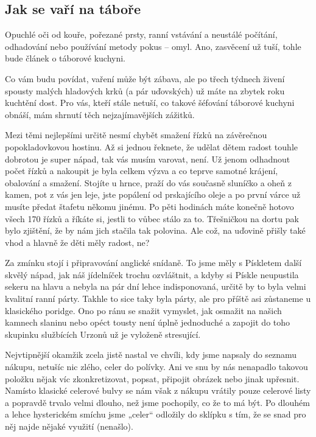 \subsection*{Jak se vaří na táboře} %
\label{sub:jak_se_vaří_na_táboře}


Opuchlé oči od kouře, pořezané prsty, ranní vstávání a neustálé počítání, odhadování nebo používání metody pokus – omyl. Ano, zasvěcení už tuší, tohle bude článek o táborové kuchyni.

Co vám budu povídat, vaření může být zábava, ale po třech týdnech živení spousty malých hladových krků (a pár uďovských) už máte na zbytek roku kuchtění dost. Pro vás, kteří stále netuší, co takové šéfování táborové kuchyni obnáší, mám shrnutí těch nejzajímavějších zážitků. 


Mezi těmi nejlepšími určitě nesmí chybět smažení řízků na závěrečnou popokladovkovou hostinu. Až si jednou řeknete, že udělat dětem radost touhle dobrotou je super nápad, tak vás musím varovat, není. Už jenom odhadnout počet řízků a nakoupit je byla celkem výzva a co teprve samotné krájení, obalování a smažení. Stojíte u hrnce, praží do vás současně sluníčko a oheň z kamen, pot z vás jen leje, jste popálení od prskajícího oleje a po první várce už musíte předat štafetu někomu jinému. Po pěti hodinách máte konečně hotovo všech 170 řízků a říkáte si, jestli to vůbec stálo za to. Třešničkou na dortu pak bylo zjištění, že by nám jich stačila tak polovina. Ale což, na uďovině přišly také vhod a hlavně že děti měly radost, ne?

Za zmínku stojí i připravování anglické snídaně. To jsme měly s Pískletem další skvělý nápad, jak náš jídelníček trochu ozvláštnit, a kdyby si Pískle neupustila sekeru na hlavu a nebyla na pár dní lehce indisponovaná, určitě by to byla velmi kvalitní ranní párty. Takhle to sice taky byla párty, ale pro příště asi zůstaneme u klasického poridge. Ono po ránu se snažit vymyslet, jak osmažit na našich kamnech slaninu nebo opéct tousty není úplně jednoduché a zapojit do toho skupinku službících Urzonů už je vyloženě stresující.

Nejvtipnější okamžik zcela jistě nastal ve chvíli, kdy jsme napsaly do seznamu nákupu, netušíc nic zlého, celer do polívky. Ani ve snu by nás nenapadlo takovou položku nějak víc zkonkretizovat, popsat, připojit obrázek nebo jinak upřesnit. Namísto klasické celerové bulvy se nám však z nákupu vrátily pouze celerové listy a popravdě trvalo velmi dlouho, než jsme pochopily, co že to má být. Po dlouhém a lehce hysterickém smíchu jsme „celer“ odložily do sklípku s tím, že se snad pro něj najde nějaké využití (nenašlo). 

